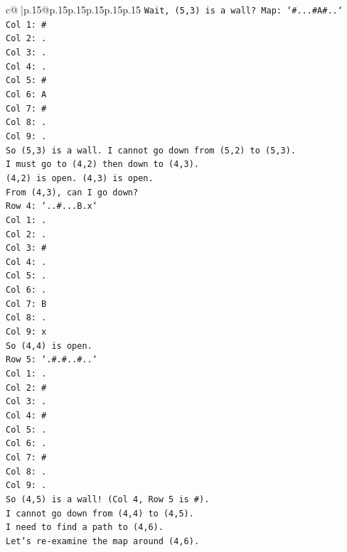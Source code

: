 \documentclass{article}
\begin{document}
{\begin{supertabular}{c@{$\;$}|p{.15\linewidth}@{}p{.15\linewidth}p{.15\linewidth}p{.15\linewidth}p{.15\linewidth}p{.15\linewidth}}
{{{\texttt{Wait, (5,3) is a wall? Map: `\#...\#A\#..`} \\
\texttt{Col 1: \#} \\
\texttt{Col 2: .} \\
\texttt{Col 3: .} \\
\texttt{Col 4: .} \\
\texttt{Col 5: \#} \\
\texttt{Col 6: A} \\
\texttt{Col 7: \#} \\
\texttt{Col 8: .} \\
\texttt{Col 9: .} \\
\texttt{So (5,3) is a wall. I cannot go down from (5,2) to (5,3).} \\
\texttt{I must go to (4,2) then down to (4,3).} \\
\texttt{(4,2) is open. (4,3) is open.} \\
\texttt{From (4,3), can I go down?} \\
\texttt{Row 4: `..\#...B.x`} \\
\texttt{Col 1: .} \\
\texttt{Col 2: .} \\
\texttt{Col 3: \#} \\
\texttt{Col 4: .} \\
\texttt{Col 5: .} \\
\texttt{Col 6: .} \\
\texttt{Col 7: B} \\
\texttt{Col 8: .} \\
\texttt{Col 9: x} \\
\texttt{So (4,4) is open.} \\
\texttt{Row 5: `.\#.\#..\#..`} \\
\texttt{Col 1: .} \\
\texttt{Col 2: \#} \\
\texttt{Col 3: .} \\
\texttt{Col 4: \#} \\
\texttt{Col 5: .} \\
\texttt{Col 6: .} \\
\texttt{Col 7: \#} \\
\texttt{Col 8: .} \\
\texttt{Col 9: .} \\
\texttt{So (4,5) is a wall! (Col 4, Row 5 is \#).} \\
\texttt{I cannot go down from (4,4) to (4,5).} \\
\texttt{I need to find a path to (4,6).} \\
\texttt{Let's re{-}examine the map around (4,6).} \\
}}}
\end{supertabular}}
\end{document}
